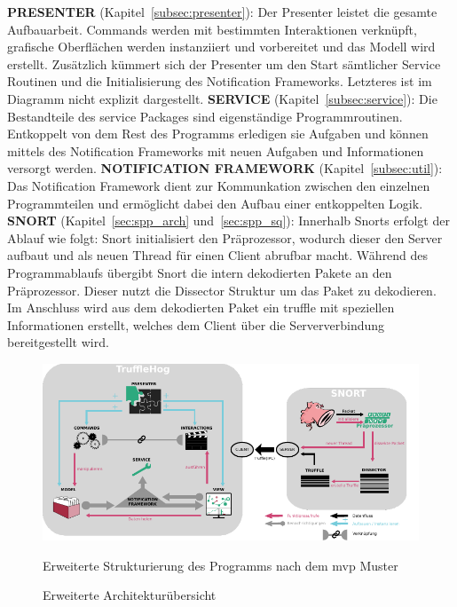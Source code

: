  \newline
\textbf{PRESENTER} (Kapitel~\ref{subsec:presenter}):\newline
Der Presenter leistet die gesamte Aufbauarbeit. Commands werden mit bestimmten Interaktionen verknüpft, grafische Oberflächen werden instanziiert und vorbereitet und das Modell wird erstellt. 
Zusätzlich kümmert sich der Presenter um den Start sämtlicher Service Routinen und die Initialisierung des Notification Frameworks. Letzteres ist im Diagramm nicht explizit dargestellt.\newline
 \newline
\textbf{SERVICE} (Kapitel~\ref{subsec:service}):\newline
Die Bestandteile des service Packages sind eigenständige Programmroutinen. Entkoppelt von dem Rest des Programms erledigen sie Aufgaben und können mittels des Notification Frameworks mit neuen Aufgaben und Informationen versorgt werden.\newline
 \newline
\textbf{NOTIFICATION FRAMEWORK} (Kapitel~\ref{subsec:util}):\newline
Das Notification Framework dient zur Kommunkation zwischen den einzelnen Programmteilen und ermöglicht dabei den Aufbau einer entkoppelten Logik.\newline
 \newline
\textbf{SNORT} (Kapitel~\ref{sec:spp_arch} und~\ref{sec:spp_sq}):\newline
Innerhalb Snorts erfolgt der Ablauf wie folgt: Snort initialisiert den Präprozessor, wodurch dieser den Server aufbaut und als neuen Thread für einen Client abrufbar macht. Während des Programmablaufs übergibt Snort die intern dekodierten Pakete an den Präprozessor. Dieser nutzt die Dissector Struktur um das Paket zu dekodieren. Im Anschluss wird aus dem dekodierten Paket ein \gls{truffle} mit speziellen Informationen erstellt, welches dem Client über die Serververbindung bereitgestellt wird.\newline

\begin{figure}
  \centering
  \includegraphics[width=\textwidth]{../diagramimages/arch_diagram_mvp.pdf}
  \caption[Erweiterte Architekturübersicht]{Erweiterte Architekturübersicht}
  \medskip
  Erweiterte Strukturierung des Programms nach dem \gls{mvp} Muster
  \label{fig:arch_diagram}
\end{figure}
\FloatBarrier
